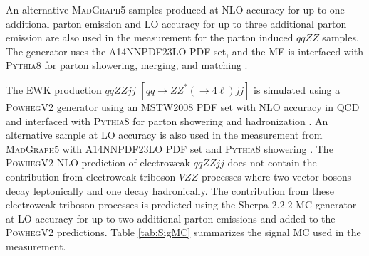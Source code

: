 An alternative \textsc{MadGraph5} samples produced at NLO accuracy for up to one additional parton emission and LO accuracy for up to three additional parton emission \cite{MADGRAPHNLO} are also used in the measurement for the parton induced $qqZZ$ samples. The generator uses the A14NNPDF23LO PDF set, and the ME is interfaced with \textsc{Pythia8} for parton showering, merging, and matching \cite{Pythia8}. 

The EWK production $qqZZjj$ $[qq \rightarrow ZZ^{*}(\rightarrow 4 \ell) jj]$ is simulated using a \textsc{PowhegV2} generator using an MSTW2008 PDF set with NLO accuracy in QCD and interfaced with \textsc{Pythia8} for parton showering and hadronization \cite{PowhegV2}. An alternative sample at LO accuracy is also used in the measurement from \textsc{MadGraph5} with A14NNPDF23LO PDF set and \textsc{Pythia8} showering \cite{MADGRAPHNLO}. The \textsc{PowhegV2} NLO prediction of electroweak $qqZZjj$ does not contain the contribution from electroweak triboson $VZZ$ processes where two vector bosons decay leptonically and one decay hadronically. The contribution from these electroweak triboson processes is predicted using the {Sherpa} $2.2.2$ MC generator at LO accuracy for up to two additional parton emissions and added to the \textsc{PowhegV2} predictions. Table \ref{tab:SigMC} summarizes the signal MC used in the measurement. 

